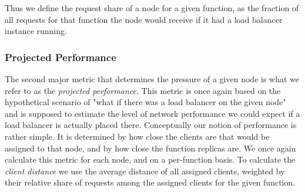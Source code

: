 Thus we define the request share of a node for a given function, as the fraction of all requests for that function the node would receive if it had a load balancer instance running.
\subsubsection{Projected Performance}
The second major metric that determines the pressure of a given node is what we refer to as the \textit{projected performance}.
This metric is once again based on the hypothetical scenario of "what if there was a load balancer on the given node" and is supposed to estimate the level of network performance we could expect if a load balancer is actually placed there.
Conceptually our notion of performance is rather simple.
It is determined by how close the clients are that would be assigned to that node, and by how close the function replicas are.
We once again calculate this metric for each node, and on a per-function basis.
To calculate the \textit{client distance} we use the average distance of all assigned clients, weighted by their relative share of requests among the assigned clients for the given function.

